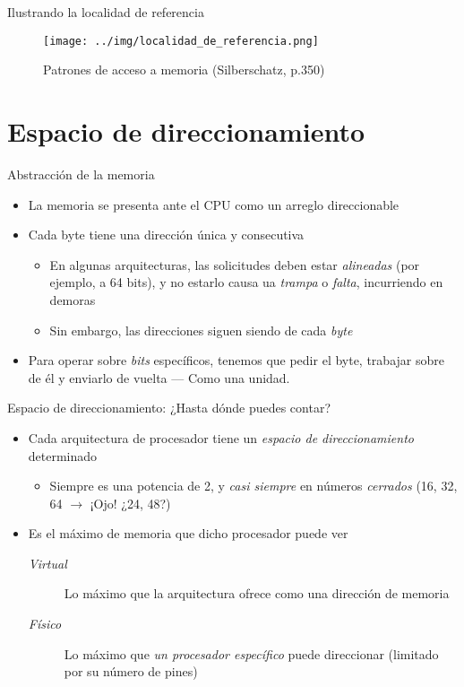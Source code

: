\documentclass[presentation]{beamer}
\begin{document}
\begin{frame}[label={sec:orgb60ede4}]{Ilustrando la localidad de referencia}
\begin{figure}[htbp]
\centering
\texttt{[image: ../img/localidad\_de\_referencia.png]}
\caption{Patrones de acceso a memoria (Silberschatz, p.350)}
\end{figure}
\end{frame}

\section{Espacio de direccionamiento}
\label{sec:orgc11eb76}
\begin{frame}[label={sec:orge8c84af}]{Abstracción de la memoria}
\begin{itemize}
\item La memoria se presenta ante el CPU como un arreglo direccionable
\item Cada byte tiene una dirección única y consecutiva
\begin{itemize}
\item En algunas arquitecturas, las solicitudes deben estar \emph{alineadas}
(por ejemplo, a 64 bits), y no estarlo causa ua \emph{trampa} o
\emph{falta}, incurriendo en demoras
\item Sin embargo, las direcciones siguen siendo de cada \emph{byte}
\end{itemize}
\item Para operar sobre \emph{bits} específicos, tenemos que pedir el byte,
trabajar sobre de él y enviarlo de vuelta — Como una unidad.
\end{itemize}
\end{frame}

\begin{frame}[label={sec:orga6bd390}]{Espacio de direccionamiento: ¿Hasta dónde puedes contar?}
\begin{itemize}
\item Cada arquitectura de procesador tiene un \emph{espacio de
direccionamiento} determinado
\begin{itemize}
\item Siempre es una potencia de 2, y \emph{casi siempre} en números
\emph{cerrados} (16, 32, 64 \(\rightarrow\) ¡Ojo! ¿24, 48?)
\end{itemize}
\item Es el máximo de memoria que dicho procesador puede ver
\begin{description}
\item[{\emph{Virtual}}] Lo máximo que la arquitectura ofrece como una
dirección de memoria
\item[{\emph{Físico}}] Lo máximo que \emph{un procesador específico} puede
direccionar (limitado por su número de pines)
\end{description}
\end{itemize}
\end{frame}
\end{document}
